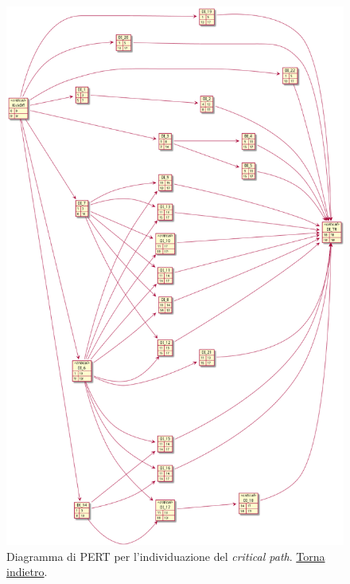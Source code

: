 \begin{figure}[H]
    \centering
    \includegraphics[width=\textwidth]{../img/pert-diagram.pm}
    \caption{Diagramma di PERT per l'individuazione del \textit{critical path}. \hyperlink{back:pert-diagram}{Torna indietro}.}
    \label{fig:pert-diagram}
\end{figure}

